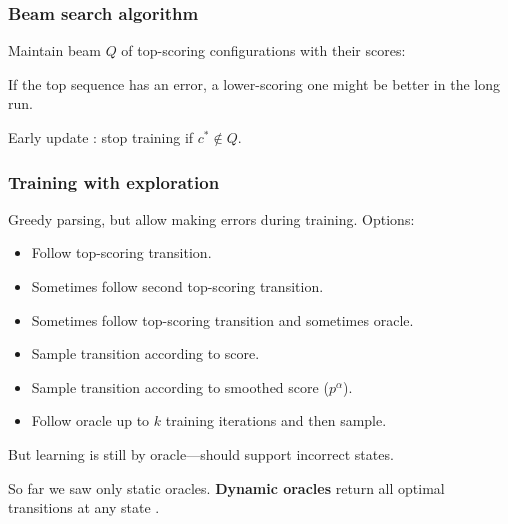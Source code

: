 \documentclass[t]{beamer}
\begin{document}
\begin{frame}
  \frametitle{Beam search algorithm}
    Maintain beam $Q$ of top-scoring configurations with their scores:
    
    \begin{algorithmic}[0]
    \ENDWHILE
    \end{algorithmic}
    
    \pause\vfill
    
    If the top sequence has an error, a lower-scoring one might be better in the long run.
    
    \pause\vfill
    
    Early update \cite{Coll:04}: stop training if $c^* \not\in Q$.
\end{frame}

\begin{frame}
  \frametitle{Training with exploration \cite{goldberg2013training}}
  Greedy parsing, but allow making errors during training. Options:
  
  \begin{itemize}
  \item Follow top-scoring transition.
  \item Sometimes follow second top-scoring transition.
  \item Sometimes follow top-scoring transition and sometimes oracle.
  \item Sample transition according to score.
  \item Sample transition according to smoothed score ($p^\alpha$).
  \item Follow oracle up to $k$ training iterations and then sample.
  \end{itemize}
  
  \pause\vfill
  
  But learning is still by oracle---should support incorrect states.
  
  So far we saw only static oracles.  
  \textbf{Dynamic oracles} return all optimal transitions at any state \cite{goldberg2012dynamic}.
\end{frame}
\end{document}
